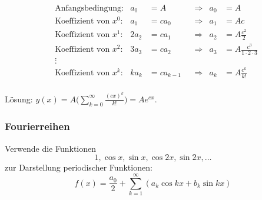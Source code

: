 \begin{frame}

\begin{koeffizientenvergleich}
\vspace{-20pt}
\begin{align*}
&\text{Anfangsbedingung:}     & a_0&=A   &&\Rightarrow& a_0&=A                \\
&\text{Koeffizient von $x^0$:}& a_1&=ca_0&&\Rightarrow& a_1&=Ac               \\
&\text{Koeffizient von $x^1$:}&2a_2&=ca_1&&\Rightarrow& a_2&=A\frac{c^2}{2}   \\
&\text{Koeffizient von $x^2$:}&3a_3&=ca_2&&\Rightarrow& a_3&=A\frac{c^3}{1\cdot 2\cdot 3}\\
&\vdots                       &    &     &&           &    &                  \\
&\text{Koeffizient von $x^k$:}&ka_k&=ca_{k-1}&&\Rightarrow& a_k&=A\frac{c^k}{k!}   \\
\end{align*}
\vspace{-20pt}
\end{koeffizientenvergleich}
Lösung:
$
\displaystyle
y(x)=A\biggl(
\sum_{k=0}^\infty \frac{(cx)^k}{k!}
\biggr)
=
Ae^{cx}.
$
\end{frame}

\begin{frame}
\frametitle{Fourierreihen}
\begin{idee}
Verwende die Funktionen 
\[
1, \cos x, \sin x, \cos 2x, \sin 2x, \dots
\]
zur Darstellung {\color{red}periodischer} Funktionen:
\[
f(x) = \frac{a_0}2 + \sum_{k=1}^\infty (a_k\cos kx + b_k\sin kx)
\]
\end{idee}
\end{frame}

